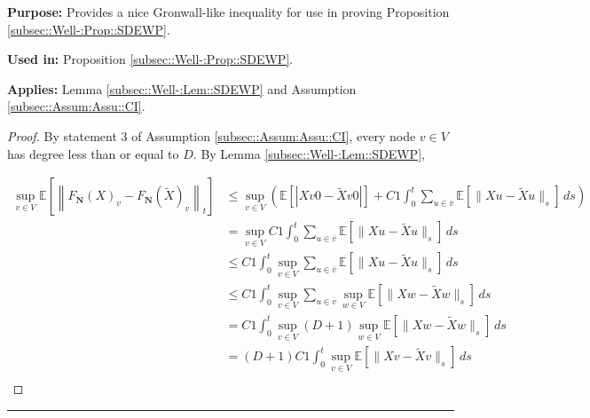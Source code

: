 \documentclass[12pt]{article}
\newcommand{\mb}{\mathbb}
\newcommand{\ov}{\overline}
\newcommand{\purpose}{\textbf{Purpose: }}
\newcommand{\usein}{\textbf{Used in: }}
\newcommand{\app}{\textbf{Applies: }}
\newcommand{\lin}{\rule{\linewidth}{0.4 pt}}
\newcommand{\ex}[1]{\mb{E}\left[#1\right]}			%
\renewcommand{\v}{v}							%
\newcommand{\vv}{u}								%
\newcommand{\vvv}{w}							%
\renewcommand{\t}{t}							%
\renewcommand{\tt}{s}							%
\newcommand{\X}{X}								%
\newcommand{\cl}{\ov}							%
\newcommand{\const}{C}							%
\newcommand{\degr}{D}							%
\newcommand{\poisses}{\mathbf{N}}				%
\newcommand{\Fpo}{F_{\poisses}}					%
\newcommand{\alt}[1]{\widetilde{#1}}			%
\begin{document}
\purpose Provides a nice Gronwall-like inequality for use in proving Proposition \ref{subsec::Well-:Prop::SDEWP}.

\usein Proposition \ref{subsec::Well-:Prop::SDEWP}.

\app Lemma \ref{subsec::Well-:Lem::SDEWP} and Assumption \ref{subsec::Assum:Assu::CI}.

\begin{proof}
By statement 3 of Assumption \ref{subsec::Assum:Assu::CI}, every node \(v \in V\) has degree less than or equal to \(\degr\). By Lemma \ref{subsec::Well-:Lem::SDEWP},

\begin{align*}
\sup_{\v \in  V} \ex{\left\|\Fpo(\X{}{})_\v - \Fpo(\alt{\X}{{}{}})_\v\right\|_\t} &\leq \sup_{\v\in  V}\left(\ex{|\X{\v}{0} - \alt{\X}{{\v}{0}}|} +  \const{1}\int_0^\t \sum_{\vv\in \cl{\v}} \ex{\|\X{\vv} - \alt{\X}{{\vv}{}}\|_\tt}\,d\tt\right)\\
&=\sup_{\v \in  V} \const{1}\int_0^\t \sum_{\vv \in \cl{\v}} \ex{\|\X{\vv} - \alt{\X}{{\vv}{}}\|_\tt}\,d\tt\\
&\leq \const{1}\int_0^\t \sup_{\v \in  V}\sum_{\vv \in \cl{\v}} \ex{\|\X{\vv} - \alt{\X}{{\vv}{}}\|_\tt}\,d\tt\\
&\leq \const{1}\int_0^\t \sup_{\v \in  V}\sum_{\vv \in \cl{\v}}\sup_{\vvv\in V} \ex{\|\X{\vvv} - \alt{\X}{{\vvv}{}}\|_\tt}\,d\tt\\
&= \const{1}\int_0^\t \sup_{\v \in  V}(\degr+1)\sup_{\vvv\in V} \ex{\|\X{\vvv} - \alt{\X}{{\vvv}{}}\|_\tt}\,d\tt\\
&= (\degr+1)\const{1}\int_0^\t \sup_{\v\in V} \ex{\|\X{\v} - \alt{\X}{{\v}{}}\|_\tt}\,d\tt\\
\end{align*}
\end{proof}
\lin
\end{document}
